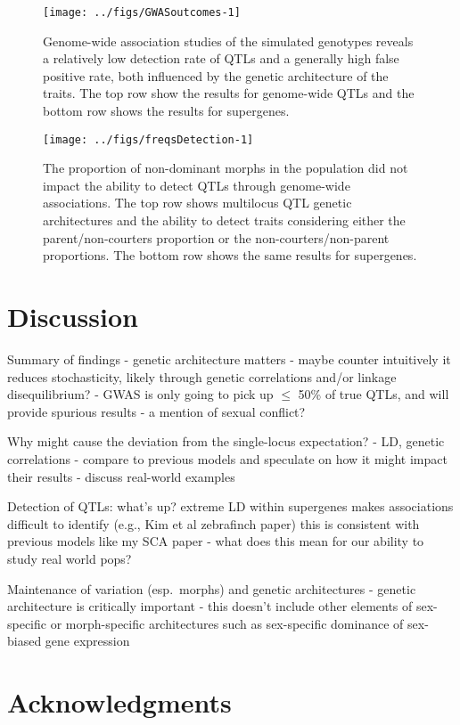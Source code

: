 \documentclass[
  11pt,
]{article}
\begin{document}
\begin{figure}[H]
\texttt{[image: ../figs/GWASoutcomes-1]} \caption{Genome-wide association studies of the simulated genotypes reveals a relatively low detection rate of QTLs and a generally high false positive rate, both influenced by the genetic architecture of the traits. The top row show the results for genome-wide QTLs and the bottom row shows the results for supergenes.}\label{fig:GWASoutcomes}
\end{figure}

\begin{figure}[H]
\texttt{[image: ../figs/freqsDetection-1]} \caption{The proportion of non-dominant morphs in the population did not impact the ability to detect QTLs through genome-wide associations. The top row shows multilocus QTL genetic architectures and the ability to detect traits considering either the parent/non-courters proportion or the non-courters/non-parent proportions. The bottom row shows the same results for supergenes.}\label{fig:freqsDetection}
\end{figure}

\hypertarget{discussion}{%
\section{Discussion}\label{discussion}}

Summary of findings - genetic architecture matters - maybe counter
intuitively it reduces stochasticity, likely through genetic
correlations and/or linkage disequilibrium? - GWAS is only going to pick
up \(\le\) 50\% of true QTLs, and will provide spurious results - a mention
of sexual conflict?

Why might cause the deviation from the single-locus expectation? - LD,
genetic correlations - compare to previous models and speculate on how
it might impact their results - discuss real-world examples

Detection of QTLs: what's up?
extreme LD within supergenes makes associations difficult to identify (e.g., Kim et al zebrafinch paper)
this is consistent with previous models
like my SCA paper - what does this mean for our ability to study real
world pops?

Maintenance of variation (esp.~morphs) and genetic architectures -
genetic architecture is critically important - this doesn't include
other elements of sex-specific or morph-specific architectures such as
sex-specific dominance of sex-biased gene expression

\hypertarget{acknowledgments}{%
\section{Acknowledgments}\label{acknowledgments}}
\end{document}
